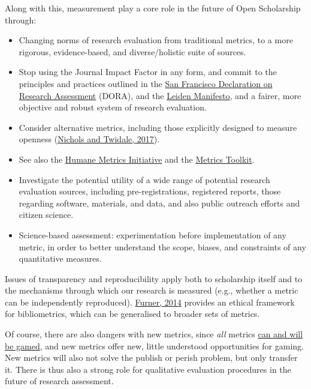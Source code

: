 Along with this, measurement play a core role in the future of Open
Scholarship through:

\begin{itemize}
\item
  Changing norms of research evaluation from traditional metrics, to a
  more rigorous, evidence-based, and diverse/holistic suite of sources.
\item
  Stop using the Journal Impact Factor in any form, and commit to the
  principles and practices outlined in the
  \href{https://sfdora.org/}{San Francisco Declaration on Research
  Assessment} (DORA), and the
  \href{http://www.leidenmanifesto.org/}{Leiden Manifesto}, and a
  fairer, more objective and robust system of research evaluation.
\item
  Consider alternative metrics, including those explicitly designed to
  measure openness (\href{https://doi.org/10.1002/asi.23741}{Nichols and
  Twidale, 2017}).
\item
  See also the \href{http://humetricshss.org/about/}{Humane Metrics
  Initiative} and the \href{http://www.metrics-toolkit.org/}{Metrics
  Toolkit}.
\item
  Investigate the potential utility of a wide range of potential
  research evaluation sources, including pre-registrations, registered
  reports, those regarding software, materials, and data, and also
  public outreach efforts and citizen science.
\item
  Science-based assessment: experimentation before implementation of any
  metric, in order to better understand the scope, biases, and
  constraints of any quantitative measures.
\end{itemize}

Issues of transparency and reproducibility apply both to scholarship
itself and to the mechanisms through which our research is measured
(e.g., whether a metric can be independently reproduced).
\href{http://www.jonathanfurner.info/docs/furnerInPress-a.pdf}{Furner,
2014} provides an ethical framework for bibliometrics, which can be
generalised to broader sets of metrics.

Of course, there are also dangers with new metrics, since \emph{all}
metrics \href{https://en.wikipedia.org/wiki/Goodhart's_law}{can and will
be gamed}, and new metrics offer new, little understood opportunities
for gaming. New metrics will also not solve the publish or perish
problem, but only transfer it. There is thus also a strong role for
qualitative evaluation procedures in the future of research assessment.

